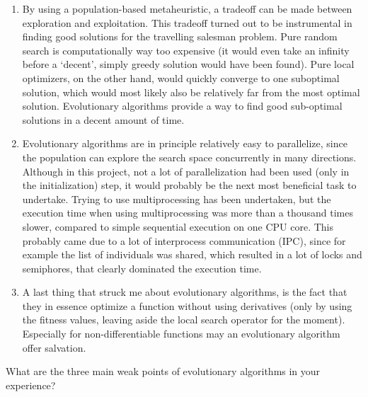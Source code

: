 \documentclass[a4paper,10pt]{article}
\newcommand{\ReplaceMe}[1]{{\color{blue}#1}}
\begin{document}
\begin{enumerate}
 \item By using a population-based metaheuristic, a tradeoff can be made between exploration and exploitation. This tradeoff turned out to be instrumental in finding good solutions for the travelling salesman problem. Pure random search is computationally way too expensive (it would even take an infinity before a `decent', simply greedy solution would have been found). Pure local optimizers, on the other hand, would quickly converge to one suboptimal solution, which would most likely also be relatively far from the most optimal solution. Evolutionary algorithms provide a way to find good sub-optimal solutions in a decent amount of time.
 \item Evolutionary algorithms are in principle relatively easy to parallelize, since the population can explore the search space concurrently in many directions. Although in this project, not a lot of parallelization had been used (only in the initialization) step, it would probably be the next most beneficial task to undertake. Trying to use multiprocessing has been undertaken, but the execution time when using multiprocessing was more than a thousand times slower, compared to simple sequential execution on one CPU core. This probably came due to a lot of interprocess communication (IPC), since for example the list of individuals was shared, which resulted in a lot of locks and semiphores, that clearly dominated the execution time.
 \item A last thing that struck me about evolutionary algorithms, is the fact that they in essence optimize a function without using derivatives (only by using the fitness values, leaving aside the local search operator for the moment). Especially for non-differentiable functions may an evolutionary algorithm offer salvation.
\end{enumerate}

\ReplaceMe{What are the three main weak points of evolutionary algorithms in your experience?}
\end{document}
